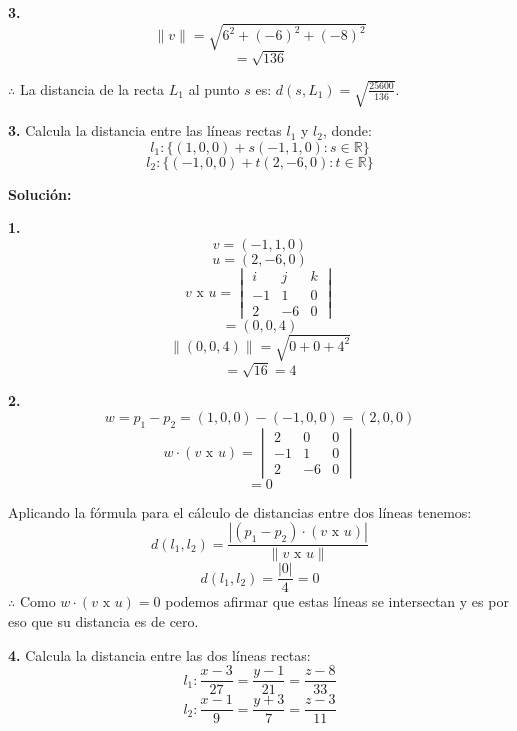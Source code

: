 \documentclass{article}
\begin{document}
\begin{minipage}[c]{0.5cm}
   \textbf{3.}
   $$\|v\| = \sqrt{6^2+ (-6)^2+ (-8)^2}$$
   $$=\sqrt{136}$$
\end{minipage}


$\therefore$ La distancia de la recta $L_1$ al punto $s$ es: $d(s,L_1) = \sqrt{\frac{25600}{136}}$.
\vspace{10pt}


\textbf{3.} Calcula la distancia entre las líneas rectas $l_1$ y $l_2$, donde:
$$l_1: \{(1,0,0)+ s (-1, 1, 0): s \in \mathbb{R}\}$$
$$l_2 : \{(-1,0,0)+t(2,-6,0): t \in \mathbb{R}\}$$
\vspace{10pt}


\textbf{Solución:}
\vspace{10pt}


\begin{minipage}[c]{0.5cm}
   \textbf{1.}
   $$v = (-1, 1, 0)$$
   $$u = (2,-6,0)$$
   $$v \text{ x } u = \begin{vmatrix}
       i & j & k \\
       -1 & 1 & 0\\
       2 & -6 & 0
   \end{vmatrix}$$
   $$=(0, 0, 4)$$
   $$\|(0,0,4)\| = \sqrt{0+0+4^2}$$
   $$= \sqrt{16} = 4$$
\end{minipage}\hspace*{7cm}\begin{minipage}[c]{0.5cm}
   \textbf{2.}
   $$w = p_1-p_2 = (1,0,0)-(-1,0,0) =(2,0,0)$$
   $$w \cdot (v \text{ x } u) = \begin{vmatrix}
       2 & 0 & 0 \\
       -1 & 1 & 0\\
       2 & -6 & 0
   \end{vmatrix}$$
   $$=0$$
\end{minipage}
\vspace{10pt}


Aplicando la fórmula para el cálculo de distancias entre dos líneas tenemos:
$$d(l_1,l_2) = \frac{\left|(p_1-p_2) \cdot(v \text{ x } u)\right|}{\|v \text{ x } u\|}$$
$$d(l_1,l_2) = \frac{\left|0\right|}{4} = 0$$
$\therefore$ Como $w \cdot (v \text{ x } u) = 0$  podemos afirmar que estas líneas se intersectan y es por eso que su distancia es de cero.
\vspace{10pt}


\textbf{4.} Calcula la distancia entre las dos líneas rectas:
$$l_1: \frac{x-3}{27}= \frac{y-1}{21} = \frac{z-8}{33}$$
$$l_2: \frac{x-1}{9} =\frac{y+3}{7} = \frac{z-3}{11}$$
\vspace{10pt}
\end{document}
